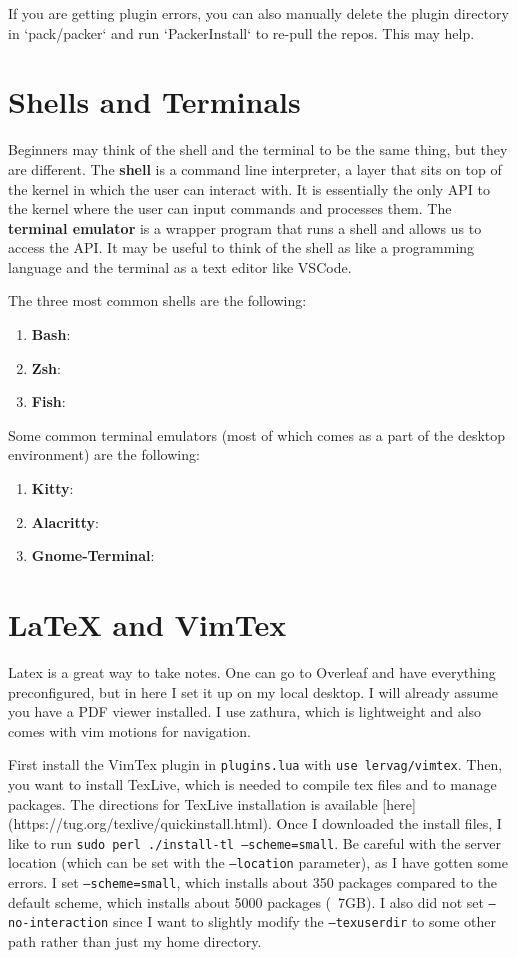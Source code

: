 \documentclass{article}
\begin{document}
    If you are getting plugin errors, you can also manually delete the plugin directory in `pack/packer` and run `PackerInstall` to re-pull the repos. This may help. 

\section{Shells and Terminals}

  Beginners may think of the shell and the terminal to be the same thing, but they are different. The \textbf{shell} is a command line interpreter, a layer that sits on top of the kernel in which the user can interact with. It is essentially the only API to the kernel where the user can input commands and processes them. The \textbf{terminal emulator} is a wrapper program that runs a shell and allows us to access the API. It may be useful to think of the shell as like a programming language and the terminal as a text editor like VSCode. 

  The three most common shells are the following: 
  \begin{enumerate}
    \item \textbf{Bash}: 
    \item \textbf{Zsh}: 
    \item \textbf{Fish}:  
  \end{enumerate}

  Some common terminal emulators (most of which comes as a part of the desktop environment) are the following: 
  \begin{enumerate}
    \item \textbf{Kitty}: 
    \item \textbf{Alacritty}: 
    \item \textbf{Gnome-Terminal}: 
  \end{enumerate}

\section{LaTeX and VimTex} 

  Latex is a great way to take notes. One can go to Overleaf and have everything preconfigured, but in here I set it up on my local desktop. I will already assume you have a PDF viewer installed. I use zathura, which is lightweight and also comes with vim motions for navigation. 

  First install the VimTex plugin in \texttt{plugins.lua} with \texttt{use lervag/vimtex}. Then, you want to install TexLive, which is needed to compile tex files and to manage packages. The directions for TexLive installation is available [here](https://tug.org/texlive/quickinstall.html). Once I downloaded the install files, I like to run \texttt{sudo perl ./install-tl --scheme=small}. Be careful with the server location (which can be set with the \texttt{--location} parameter), as I have gotten some errors. I set \texttt{--scheme=small}, which installs about 350 packages compared to the default scheme, which installs about 5000 packages (~7GB). I also did not set \texttt{--no-interaction} since I want to slightly modify the \texttt{--texuserdir} to some other path rather than just my home directory. 
\end{document}
